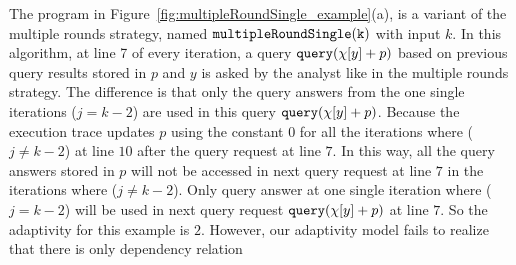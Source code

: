 \begin{example}
    \label{ex:multipleRoundsSingle_example}
    The program in Figure~\ref{fig:multipleRoundSingle_example}(a),
    is a variant of the multiple rounds strategy, 
    named $\mathtt{multipleRoundSingle(k)}$ with input $k$.
    In this algorithm, 
    at line 7 of every iteration, 
    a query ${\tt query}(\chi[y] + p)$ based on previous query results stored in $p$ and $y$ is asked by the analyst like in the multiple rounds strategy. 
    The difference is that only the query answers from the one single iterations ($j = k - 2 $) are 
    used in this query ${\tt query}(\chi[y] + p)$.
    Because the execution trace updates 
    $p$ using the constant $0$ for all the iterations where ($j \neq k - 2$) at line $10$ after the 
    query request at line $7$.
    In this way, all the query answers stored in $p$ will not be accessed in next query request at line $7$ in the iterations 
    where  ($j \neq k - 2$).
    Only query answer at one single iteration where ($j = k - 2 $) will be used in next query request
    ${\tt query}(\chi[y] + p)$ at line $7$.
    So the adaptivity for this example is $2$. 
    However, our adaptivity model fails to realize that there is only dependency relation 

\end{example}
